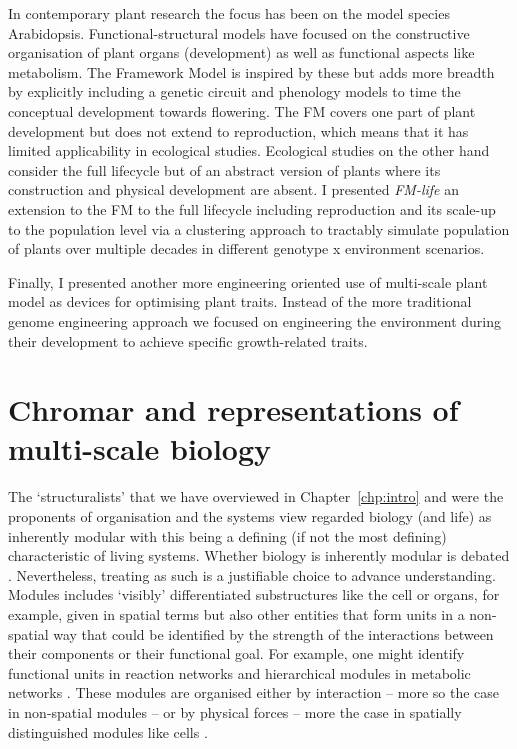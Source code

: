 In contemporary plant research the focus has been on the model species
Arabidopsis. Functional-structural models have focused on the constructive
organisation of plant organs (development) as well as functional aspects like
metabolism. The Framework Model \citep{chew_multiscale_2014} is inspired by
these but adds more breadth by explicitly including a genetic circuit and
phenology models to time the conceptual development towards flowering. The FM
covers one part of plant development but does not extend to reproduction, which
means that it has limited applicability in ecological studies. Ecological
studies on the other hand consider the full lifecycle but of an abstract version
of plants where its construction and physical development are absent. I
presented \emph{FM-life} an extension to the FM to the full lifecycle including
reproduction and its scale-up to the population level via a clustering approach
to tractably simulate population of plants over multiple decades in different
genotype x environment scenarios.

Finally, I presented another more engineering oriented use of multi-scale plant
model as devices for optimising plant traits. Instead of the more traditional
genome engineering approach we focused on engineering the environment during
their development to achieve specific growth-related traits.

\section{Chromar and representations of multi-scale biology}
The `structuralists' that we have overviewed in Chapter~\ref{chp:intro} and were
the proponents of organisation and the systems view regarded biology (and life)
as inherently modular with this being a defining (if not the most defining)
characteristic of living systems. Whether biology is inherently modular is
debated \citep{hartwell1999molecular}. %
Nevertheless, treating as such is a
justifiable choice to advance understanding. Modules includes `visibly'
differentiated substructures like the cell or organs, for example, given in
spatial terms but also other entities that form units in a non-spatial way that
could be identified by the strength of the interactions between their components
or their functional goal. For example, one might identify functional units in
reaction networks \citep{ederer_approach_2003} and hierarchical modules in
metabolic networks \citep{ravasz_hierarchical_2002}. These modules are organised
either by interaction -- more so the case in non-spatial modules -- or by
physical forces -- more the case in spatially distinguished modules like cells
\citep[`Biological and Physical systems' section]{simon1962architecture}.


